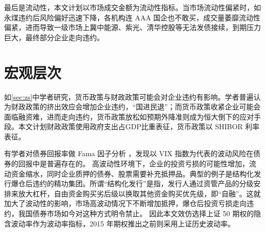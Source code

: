 最后是流动性，本文计划以市场成交金额为流动性指标。当市场流动性偏紧时，如永煤违约后风险偏好迅速下降，各机构连 AAA 国企也不敢买，成交量萎靡流动性偏紧，进而导致一级市场上冀中能源、紫光、清华控股等无法发债接续，到期压力巨大，最终部分企业走向违约。
\section{宏观层次}
如\ref{sec:zs}中学者研究，货币政策与财政政策可能会对企业违约有影响。学者普遍认为财政政策的挤出效应会增加企业违约，“国进民退”；而货币政策收紧企业可能会面临融资难，进而走向违约，货币政策放松如预期外降准则成为恒大倒下的应对手段。本文计划财政政策使用政府支出占GDP比重表征，货币政策以 SHIBOR 利率表征。

有学者对债券回报率做 Fama 因子分析
\cite{chung2019volatility}
，发现以 VIX 指数为代表的波动风险在债券的回报中是普遍存在的。
高波动性环境下，企业的投资亏损的可能性增加，流动资金缩水，同时企业质押的债券、股票需要补充抵押品。典型的例子是结构化发行爆仓后违约的精功集团。所谓“结构化发行”是指，发行人通过资管产品的分级安排来放大杠杆，自由资金购买劣后级以换取其他资金购买优先级，即“自融”。这就加大了波动性的影响，市场高波动情况下不断增加抵押，爆仓后投资亏损走向违约，我国债券市场如今对这种方式明令禁止。
因此本文效仿选择上证 50 期权的隐含波动率作为波动率指标，2015 年期权推出之前则采用上证历史波动率。
